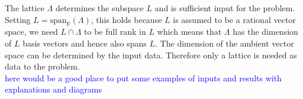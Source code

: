 \documentclass{article}
\newcommand{\nl}{\bigskip \\ } %
\renewcommand{\leq}{\leqslant}
\newcommand{\Z}[0]{\mathbb{Z}}		%
\newcommand{\R}[0]{\mathbb{R}}		%
\newcommand{\y}[0]{\mathcal{y}}
\newtheorem{ex}[thm]{Example}
\theoremstyle{definition}
\theoremstyle{remark}
\begin{document}
The lattice $\Lambda$ determines the subspace $L$ and is sufficient input for the problem. Setting $L  =\text{span}_\R(\Lambda)$, this holds because $L$ is assumed to be a rational vector space, we need $L\cap \Lambda$ to be full rank in $L$ which means that $\Lambda$ has the dimension of $L$ basis vectors and hence also spans $L$. The dimension of the ambient vector space can be determined by the input data. Therefore only a lattice is needed as data to the problem. \nl 

\textcolor{blue}{here would be a good place to put some examples of inputs and results with explanations and diagrams}



\end{document}
